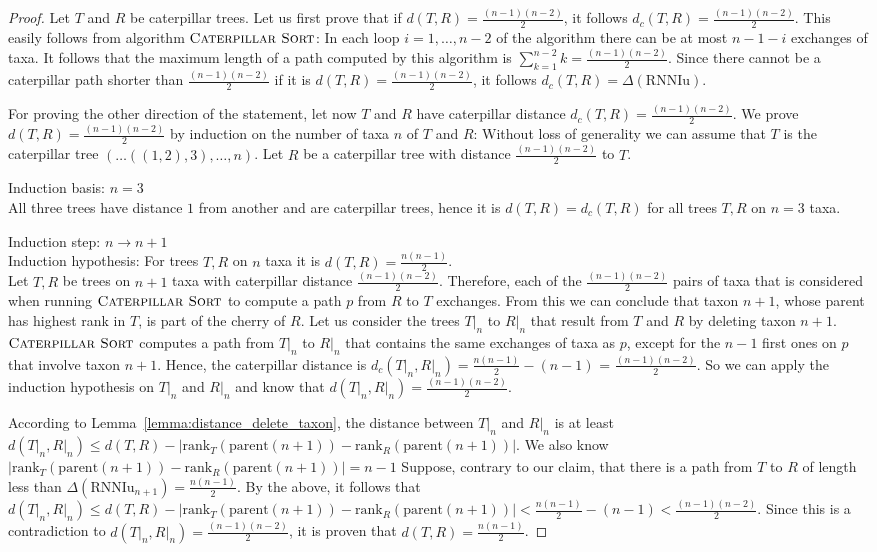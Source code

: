 \documentclass{amsart}
\newcommand{\parent}{\mathrm{parent}}
\newcommand{\rank}{\mathrm{rank}}
\newcommand{\rnniu}{\mathrm{RNNIu}}
\newcommand{\csort}{\textsc{Caterpillar Sort}}
\begin{document}
\begin{proof}
    Let $T$ and $R$ be caterpillar trees.
    Let us first prove that if $d(T,R) = \frac{(n-1)(n-2)}{2}$, it follows $d_c(T,R) = \frac{(n-1)(n-2)}{2}$.
    This easily follows from algorithm $\csort$:
    In each loop $i=1, \ldots, n-2$ of the algorithm there can be at most $n-1-i$ exchanges of taxa.
    It follows that the maximum length of a path computed by this algorithm is $\sum\limits_{k=1}^{n-2} k = \frac{(n-1)(n-2)}{2}$.
    Since there cannot be a caterpillar path shorter than $\frac{(n-1)(n-2)}{2}$ if it is $d(T,R) = \frac{(n-1)(n-2)}{2}$, it follows $d_c(T,R) = \Delta(\rnniu)$.

    For proving the other direction of the statement, let now $T$ and $R$ have caterpillar distance $d_c(T,R) =  \frac{(n-1)(n-2)}{2}$.
    We prove $d(T,R) = \frac{(n-1)(n-2)}{2}$ by induction on the number of taxa $n$ of $T$ and $R$:
    Without loss of generality we can assume that $T$ is the caterpillar tree $(\ldots ((1,2),3), \ldots, n)$.
    Let $R$ be a caterpillar tree with distance $\frac{(n-1)(n-2)}{2}$ to $T$.

    Induction basis: $n=3$\\
    All three trees have distance $1$ from another and are caterpillar trees, hence it is $d(T,R) = d_c(T,R)$ for all trees $T,R$ on $n=3$ taxa.

    Induction step: $n \to n+1$\\
    Induction hypothesis: For trees $T, R$ on $n$ taxa it is $d(T, R) = \frac{n(n-1)}{2}$.\\
    Let $T, R$ be trees on $n+1$ taxa with caterpillar distance $\frac{(n-1)(n-2)}{2}$.
    Therefore, each of the $\frac{(n-1)(n-2)}{2}$ pairs of taxa that is considered when running $\csort$ to compute a path $p$ from $R$ to $T$ exchanges.
    From this we can conclude that taxon $n+1$, whose parent has highest rank in $T$, is part of the cherry of $R$.
    Let us consider the trees $T{\big|}_n$ to $R{\big|}_n$ that result from $T$ and $R$ by deleting taxon $n+1$.
    $\csort$ computes a path from $T{\big|}_n$ to $R{\big|}_n$ that contains the same exchanges of taxa as $p$, except for the $n-1$ first ones on $p$ that involve taxon $n+1$.
    Hence, the caterpillar distance is $d_c(T{\big|}_n, R{\big|}_n) = \frac{n(n-1)}{2} - (n-1)$ = $\frac{(n-1)(n-2)}{2}$.
    So we can apply the induction hypothesis on $T{\big|}_n$ and $R{\big|}_n$ and know that $d(T{\big|}_n,R{\big|}_n) = \frac{(n-1)(n-2)}{2}$.

    According to Lemma~\ref{lemma:distance_delete_taxon}, the distance between $T{\big|}_n$ and $R{\big|}_n$ is at least $d(T{\big|}_n, R{\big|}_n) \leq d(T,R) - |\rank_T(\parent(n+1)) - \rank_R(\parent(n+1))|$.
    We also know $|\rank_T(\parent(n+1)) - \rank_R(\parent(n+1))| = n-1$
    Suppose, contrary to our claim, that there is a path from $T$ to $R$ of length less than $\Delta(\rnniu_{n+1}) = \frac{n(n-1)}{2}$.
    By the above, it follows that $d(T{\big|}_n, R{\big|}_n) \leq d(T,R) - |\rank_T(\parent(n+1)) - \rank_R(\parent(n+1))| < \frac{n(n-1)}{2} - (n-1) < \frac{(n-1)(n-2)}{2}$.
    Since this is a contradiction to $d(T{\big|}_n, R{\big|}_n) = \frac{(n-1)(n-2)}{2}$, it is proven that $d(T,R) = \frac{n(n-1)}{2} $.


\end{proof}
\end{document}
